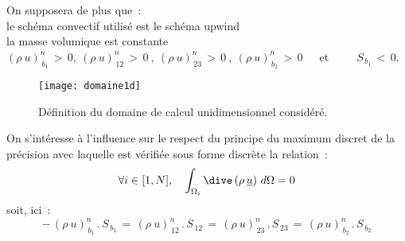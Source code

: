 On supposera de plus que~:\\
\hspace*{1cm}{\tiny$\bigstar$} le sch\'ema convectif utilis\'e est le sch\'ema upwind\\
\hspace*{1cm}{\tiny$\bigstar$} la masse volumique est constante\\
\hspace*{1cm}{\tiny$\bigstar$} $(\rho\ u)^n_{\,b_1}\,>\,0,\ (\rho\ u)^n_{\,12}\,>\,0\ ,\
(\rho\ u)^n_{\,23}\,>\, 0\ ,\ (\rho\ u)^n_{\,b_2}\,>\,0$\ \ \
et\ \ \ \ \ $S_{\,b_1}\,<\,0$.

\begin{figure}[htp]
\centerline{\texttt{[image: domaine1d]}}
\caption{\label{Base_Covofi_domaine1d_fig}D\'efinition du domaine de calcul unidimensionnel
consid\'er\'e.}
\end{figure}


On s'int\'eresse \`a l'influence sur le respect du principe du maximum discret
de la pr\'ecision avec laquelle est v\'erifi\'ee sous forme discr\`ete la
relation~:
$$\forall i \in [1,N],\ \ \ \displaystyle\int_{\Omega_i}\dive\,(\rho\,\underline{u})\ d\Omega = 0$$
soit, ici~:
\begin{equation}
\label{Base_Covofi_ContinuiteDiscreteExemple}
-\,(\rho\ u)^n_{\,b_1}\,.\,S_{\,b_1}\,=\,(\rho\ u)^n_{\,12}\,.\,S_{\,12}\,
=\,(\rho\ u)^n_{\,23}\,.\,S_{\,23}\,=\,(\rho\ u)^n_{\,b_2}\,.\,S_{\,b_2}
\end{equation}

